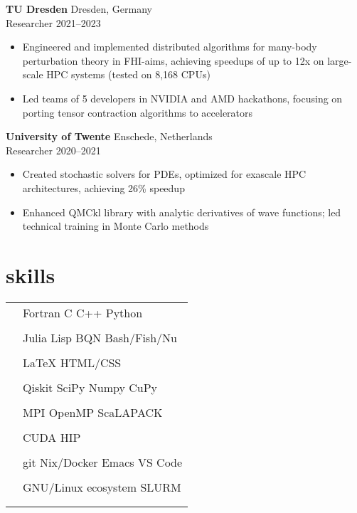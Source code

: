 \documentclass[12pt]{article}
\newcommand{\entry}[4]{{{\textbf{#1}}} \hfill #3 \\ #2 \hfill #4}
\newcommand{\tableentry}[3]{\textsc{#1} & #2\expandafter\ifstrequal\expandafter{#3}{}{\\}{\\[6pt]}}
\begin{document}
\begin{paracol}{2}
    \entry{TU Dresden}{Researcher}{Dresden, Germany}{2021--2023}
    \begin{itemize}[noitemsep,leftmargin=3.5mm,rightmargin=0mm,topsep=6pt]
    \item Engineered and implemented distributed algorithms for many-body perturbation theory in FHI-aims, achieving speedups of up to 12x on large-scale HPC systems (tested on 8,168 CPUs)
    \item Led teams of 5 developers in NVIDIA and AMD hackathons, focusing on porting tensor contraction algorithms to accelerators
    \end{itemize}

    \entry{University of Twente}{Researcher}{Enschede, Netherlands}{2020--2021}
    \begin{itemize}[noitemsep,leftmargin=3.5mm,rightmargin=0mm,topsep=6pt]
    \item Created stochastic solvers for PDEs, optimized for exascale HPC architectures, achieving 26\% speedup
    \item Enhanced QMCkl library with analytic derivatives of wave functions; led technical training in Monte Carlo methods
    \end{itemize}


    \switchcolumn{}

    \section{skills}
    \begin{supertabular}{rl}
      \tableentry{\footnotesize\faCode}{Fortran \textperiodcentered{} C
        \textperiodcentered{} C++ \textperiodcentered{} Python}{}
      \tableentry{}{Julia \textperiodcentered{} Lisp \textperiodcentered{} BQN \textperiodcentered{} Bash/Fish/Nu}{}
      \tableentry{}{LaTeX \textperiodcentered{} HTML/CSS}{}
      \tableentry{\footnotesize\faCogs}{Qiskit \textperiodcentered{} SciPy \textperiodcentered{} Numpy \textperiodcentered{} CuPy}{}
      \tableentry{}{MPI \textperiodcentered{} OpenMP \textperiodcentered{} ScaLAPACK}{}
      \tableentry{}{CUDA \textperiodcentered{} HIP}{}
      \tableentry{\footnotesize\faLaptop}{git \textperiodcentered{} Nix/Docker \textperiodcentered{}  Emacs \textperiodcentered{} VS Code}{}
      \tableentry{}{GNU/Linux ecosystem \textperiodcentered{} SLURM}{}


\end{supertabular}
\end{paracol}
\end{document}
